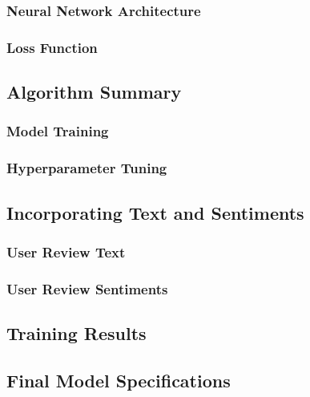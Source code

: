 \subsubsection{Neural Network Architecture}
\label{subsubsec:Neural Network Architecture}

\subsubsection{Loss Function}
\label{subsubsec:Loss Function}


\subsection{Algorithm Summary}
\label{subsec:Algorithm Summary}

\subsubsection{Model Training}
\label{subsubsec:Model Training}

\subsubsection{Hyperparameter Tuning}
\label{subsubsec:Hyperparameter Tuning}

\subsection{Incorporating Text and Sentiments}
\label{subsec:Incorporating Text and Sentiments}

\subsubsection{User Review Text}
\label{subsubsec:User Review Text}

\subsubsection{User Review Sentiments}
\label{subsubsec:User Review Sentiments}


\subsection{Training Results}
\label{subsec:Training Results}

\subsection{Final Model Specifications}
\label{subsec:Final Model Specifications}

